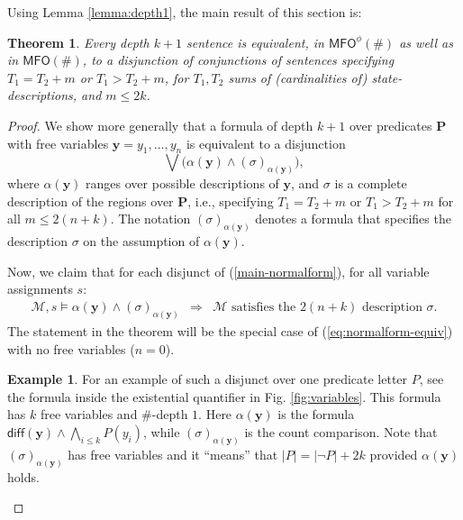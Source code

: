\documentclass[12pt,oneside,reqno]{amsart}
\newtheorem{theorem}{Theorem}
\theoremstyle{definition}
\newtheorem{example}{Example}
\begin{document}
Using Lemma \ref{lemma:depth1}, the main result of this section is: 
\begin{theorem} Every depth $k+1$ sentence is equivalent, in $\mathsf{MFO}^\phi(\#)$ as well as in $\mathsf{MFO}(\#)$, to a disjunction of conjunctions of sentences specifying $T_1 = T_2 +m$ or $T_1 > T_2+m$, for $T_1,T_2$ sums of (cardinalities of) state-descriptions, and $m\leq 2k$. \label{normal}
\end{theorem} 
\begin{proof} We show more generally that a formula of depth $k+1$ over predicates $\mathbf{P}$ with free variables $\mathbf{y} = y_1,\dots,y_n$ is equivalent to a disjunction \begin{equation}\bigvee \big( \alpha(\mathbf{y}) \wedge  (\sigma)_{\alpha(\mathbf{y})} \big), \label{main-normalform}\end{equation} where $\alpha(\mathbf{y})$ ranges over possible descriptions of $\mathbf{y}$, and $\sigma$ is a complete description of the regions over $\mathbf{P}$, i.e., specifying $T_1 = T_2 +m$ or $T_1 > T_2+m$ for all $m\leq 2(n+k)$. The notation $(\sigma)_{\alpha(\mathbf{y})}$ denotes a formula that specifies the description $\sigma$ on the assumption of $\alpha(\mathbf{y})$. 

Now, we claim that for each disjunct of (\ref{main-normalform}), for all variable assignments $s$: \begin{eqnarray} \mathcal{M},s \vDash \alpha(\mathbf{y}) \wedge  (\sigma)_{\alpha(\mathbf{y})} & \Rightarrow & \mathcal{M}\mbox{ satisfies the }2(n+k)\mbox{ description }\sigma. \label{eq:normalform-equiv}
\end{eqnarray}
The statement in the theorem will be the special case of (\ref{eq:normalform-equiv}) with no free variables ($n=0$). 

\begin{example} For an example of such a disjunct over one predicate letter $P$, see the formula inside the existential quantifier in Fig. \ref{fig:variables}. This formula has $k$ free variables and $\#$-depth $1$. Here $\alpha(\mathbf{y})$ is the formula $\mathsf{diff}(\mathbf{y}) \wedge \bigwedge_{i \leq k} P(y_i)$, while $(\sigma)_{\alpha(\mathbf{y})}$ is the count comparison. Note that $(\sigma)_{\alpha(\mathbf{y})}$ has free variables and it ``means'' that $|P| = |\neg P| + 2k$ provided $\alpha(\mathbf{y})$ holds.  \end{example} 


\end{proof}
\end{document}
